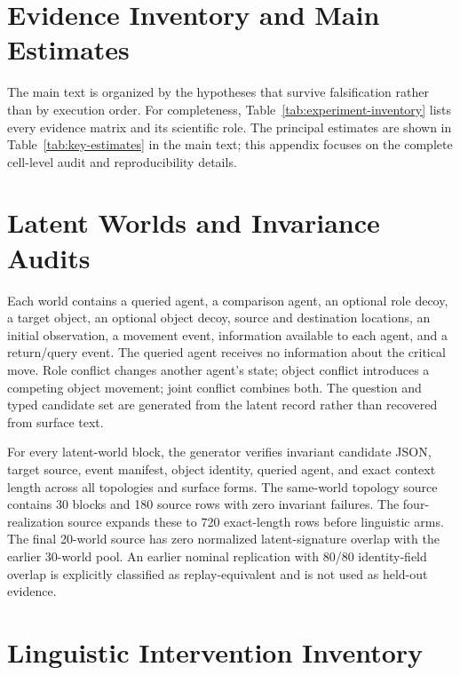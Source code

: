 \section{Evidence Inventory and Main Estimates}
\label{app:evidence-inventory}

The main text is organized by the hypotheses that survive falsification rather
than by execution order. For completeness, Table~\ref{tab:experiment-inventory}
lists every evidence matrix and its scientific role. The principal estimates
are shown in Table~\ref{tab:key-estimates} in the main text; this appendix
focuses on the complete cell-level audit and reproducibility details.



\section{Latent Worlds and Invariance Audits}
\label{app:latent-worlds}

Each world contains a queried agent, a comparison agent, an optional role
decoy, a target object, an optional object decoy, source and destination
locations, an initial observation, a movement event, information available to
each agent, and a return/query event. The queried agent receives no information
about the critical move. Role conflict changes another agent's state; object
conflict introduces a competing object movement; joint conflict combines both.
The question and typed candidate set are generated from the latent record rather
than recovered from surface text.

For every latent-world block, the generator verifies invariant candidate JSON,
target source, event manifest, object identity, queried agent, and exact context
length across all topologies and surface forms. The same-world topology source
contains 30 blocks and 180 source rows with zero invariant failures. The
four-realization source expands these to 720 exact-length rows before linguistic
arms. The final 20-world source has zero normalized latent-signature overlap
with the earlier 30-world pool. An earlier nominal replication with 80/80
identity-field overlap is explicitly classified as replay-equivalent and is not
used as held-out evidence.

\section{Linguistic Intervention Inventory}
\label{app:linguistic-arms}

